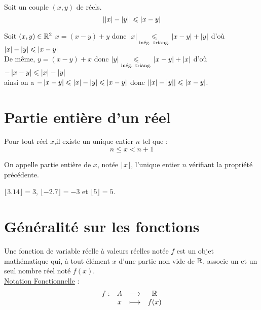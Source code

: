 \begin{prop}
	Soit un couple \((x,y)\) de réels.
	\[\left\lvert\left\lvert x\right\rvert-\left\lvert y\right\rvert\right\rvert \leqslant\left\lvert x-y\right\rvert\]
\end{prop}

\begin{dem}
	Soit \((x,y) \in \mathbb{R}^2\)
	\(x =(x-y)+y\) donc \(\left\lvert x\right\rvert \underset{\mathrm{\text{inég. triang.}}}{\leqslant} \left\lvert x-y\right\rvert+\left\lvert y\right\rvert\) d'où \(\left\lvert x\right\rvert - \left\lvert y\right\rvert \leqslant \left\lvert x-y\right\rvert\) \\
	De même, \(y =(x-y)+x\) donc \(\left\lvert y\right\rvert \underset{\mathrm{\text{inég. triang.}}}{\leqslant} \left\lvert x-y\right\rvert+\left\lvert x\right\rvert\) d'où \( -\left\lvert x-y\right\rvert \leqslant\left\lvert x\right\rvert - \left\lvert y\right\rvert\)\\

	ainsi on a \(-\left\lvert x-y\right\rvert \leqslant\left\lvert x\right\rvert - \left\lvert y\right\rvert \leqslant \left\lvert x-y\right\rvert\) donc \(\left\lvert\left\lvert x\right\rvert-\left\lvert y\right\rvert\right\rvert \leqslant\left\lvert x-y\right\rvert\).
\end{dem}

\section{Partie entière d'un réel}
\begin{prop}
	Pour tout réel \(x\),il existe un unique entier \(n\) tel que :
	\[n\leq x < n+1\]
\end{prop}
\begin{defi}
	On appelle partie entière de \(x\), notée \(\lfloor x \rfloor\), l'unique entier \(n\) vérifiant la propriété précédente.
\end{defi}

\begin{ex}
	\(\lfloor 3.14 \rfloor = 3\), \(\lfloor -2.7 \rfloor = -3\) et \(\lfloor 5 \rfloor = 5\).
\end{ex}

\section{Généralité sur les fonctions}
\begin{defi} [Fonction]
	Une fonction de variable réelle à valeurs réelles notée \(f\) est un objet mathématique qui, à tout élément \(x\) d’une partie non vide de \(\mathbb{R}\), associe un et un seul nombre réel noté \(f(x)\). \\
	\underline{Notation Fonctionnelle} : \[\begin{array}[t]{cccc}f : & A & \longrightarrow & \mathbb{R} \\ & x & \longmapsto & f(x)\end{array}\]
\end{defi}

